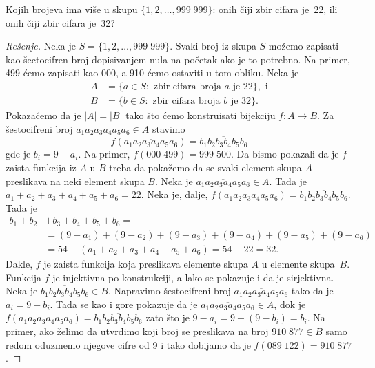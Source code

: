 \begin{EX}\label{ft08.ex.22-34}
  Kojih brojeva ima vi\v se u skupu $\{1, 2, \ldots, 999\;999\}$: onih \v ciji zbir cifara je~22, ili onih \v ciji zbir cifara je~32?
\end{EX}
\begin{proof}[Re\v senje]
  Neka je $S = \{1, 2, \ldots, 999\;999\}$. Svaki broj iz skupa $S$ mo\v zemo zapisati kao \v sectocifren broj dopisivanjem nula
  na po\v cetak ako je to potrebno. Na primer, 499 \'cemo zapisati kao 000, a 910 \'cemo ostaviti u tom obliku.
  Neka je
  \begin{align*}
    A &= \{ a \in S : \text{ zbir cifara broja $a$ je 22}\}, \text{ i}\\
    B &= \{ b \in S : \text{ zbir cifara broja $b$ je 32}\}.
  \end{align*}
  Pokaza\'cemo da je $|A| = |B|$ tako \v sto \'cemo konstruisati bijekciju $f : A \to B$.
  Za \v sestocifreni broj $\overline{a_1 a_2 a_3 a_4 a_5 a_6} \in A$ stavimo
  $$
    f(\overline{a_1 a_2 a_3 a_4 a_5 a_6}) = \overline{b_1 b_2 b_3 b_4 b_5 b_6}
  $$
  gde je $b_i = 9 - a_i$. Na primer, $f(000\;499) = 999\;500$.
  Da bismo pokazali da je $f$ zaista funkcija iz $A$ u $B$ treba da poka\v zemo da se svaki element skupa $A$ preslikava
  na neki element skupa $B$. Neka je \hbox{$\overline{a_1 a_2 a_3 a_4 a_5 a_6} \in A$}. Tada je
  $a_1 + a_2 + a_3 + a_4 + a_5 + a_6 = 22$. Neka je, dalje,
  $f(\overline{a_1 a_2 a_3 a_4 a_5 a_6}) = \overline{b_1 b_2 b_3 b_4 b_5 b_6}$. Tada je
  \begin{align*}
  b_1 + b_2 &+ b_3 + b_4 + b_5 + b_6 = \\
  &= (9 - a_1) + (9 - a_2) + (9 - a_3) + (9 - a_4) + (9 - a_5) + (9 - a_6)\\
  &= 54 - (a_1 + a_2 + a_3 + a_4 + a_5 + a_6) = 54 - 22 = 32.
  \end{align*}
  Dakle, $f$ je zaista funkcija koja preslikava elemente skupa $A$ u elemente skupa~$B$.
  Funkcija $f$ je injektivna po konstrukciji, a lako se pokazuje i da je sirjektivna. Neka je
  $\overline{b_1 b_2 b_3 b_4 b_5 b_6} \in B$. Napravimo \v sestocifreni broj
  $\overline{a_1 a_2 a_3 a_4 a_5 a_6}$ tako da je $a_i = 9 - b_i$. Tada se kao i gore pokazuje
  da je $\overline{a_1 a_2 a_3 a_4 a_5 a_6} \in A$, dok je
  $f(\overline{a_1 a_2 a_3 a_4 a_5 a_6}) = \overline{b_1 b_2 b_3 b_4 b_5 b_6}$
  zato \v sto je $9 - a_i = 9 - (9 - b_i) = b_i$. Na primer, ako \v zelimo da utvrdimo koji broj se preslikava
  na broj $910\;877 \in B$ samo redom oduzmemo njegove cifre od 9 i tako dobijamo da je
  $f(089\;122) = 910\;877$.
\end{proof}

